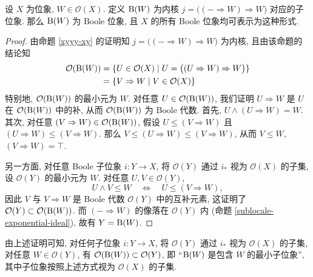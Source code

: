 \begin{propdef}
	[label={Boolean-sublocale}]
	{}
	设 $X$ 为位象, $W\in\mathcal O(X)$.
	定义 $\text{B}(W)$ 为内核 $j = \big((-\Rightarrow W) \Rightarrow W\big)$ 对应的子位象.
	那么 $\text{B}(W)$ 为 Boole 位象, 且 $X$ 的所有 Boole 位象均可表示为这种形式.
\end{propdef}
\begin{proof}
	由命题 \ref{xyyy-xy} 的证明知 $j = \big((-\Rightarrow W) \Rightarrow W\big)$ 为内核,
	且由该命题的结论知
	$$
	\begin{aligned}
		\mathcal O(\text{B}(W)) &= \{U\in\mathcal O(X) \mid U=\big((U\Rightarrow W)\Rightarrow W\big)\}\\
		&= \{V\Rightarrow W \mid V\in\mathcal O(X)\}
	\end{aligned}
	$$
	特别地, $\mathcal O(\text{B}(W))$ 的最小元为 $W$.
	对任意 $U\in \mathcal O(\text{B}(W))$,
	我们证明 $U\Rightarrow W$ 是 $U$ 在 $\mathcal O(\text{B}(W))$ 中的补, 从而 $\mathcal O(\text{B}(W))$ 为 Boole 代数.
	首先, $U\land (U\Rightarrow W) = W$.
	其次, 对任意 $(V\Rightarrow W)\in \mathcal O(\text{B}(W))$,
	假设 $U\leq (V\Rightarrow W)$ 且 $(U\Rightarrow W) \leq (V\Rightarrow W)$.
	那么 $V\leq (U\Rightarrow W) \leq (V\Rightarrow W)$, 从而 $V\leq W$, $(V\Rightarrow W) = \top$.
	
	另一方面, 对任意 Boole 子位象 $i\colon Y\to X$, 将 $\mathcal O(Y)$ 通过 $i_*$ 视为 $\mathcal O(X)$ 的子集,
	设 $\mathcal O(Y)$ 的最小元为 $W$. 对任意 $U,V\in \mathcal O(Y)$,
	\[
	U\land V\leq W \quad\Leftrightarrow \quad U\leq (V\Rightarrow W),
	\]
	因此 $V$ 与 $V\Rightarrow W$ 是 Boole 代数 $\mathcal O(Y)$ 中的互补元素, 这证明了 $\mathcal O(Y)\subset\mathcal O(\text{B}(W))$.
	而 $(-\Rightarrow W)$ 的像落在 $\mathcal O(Y)$ 内 (命题 \ref{sublocale-exponential-ideal}),
	故有 $Y = \text{B}(W)$.
\end{proof}
由上述证明可知, 对任何子位象 $i\colon Y\to X$, 将 $\mathcal O(Y)$ 通过 $i_*$ 视为 $\mathcal O(X)$ 的子集,
对任意 $W\in\mathcal O(Y)$, 有 $\mathcal O(\text{B}(W)) \subset\mathcal O(Y)$,
即 ``$\text{B}(W)$ 是包含 $W$ 的最小子位象'', 其中子位象按照上述方式视为 $\mathcal O(X)$ 的子集.

